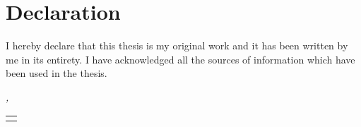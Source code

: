 \chapter*{Declaration}
\thispagestyle{empty}
I hereby declare that this thesis is my original work and it has been written
by me in its entirety. I have acknowledged all the sources of information
which have been used in the thesis.

\vspace*{1.0\baselineskip}
 
\noindent\textit{\myLocation, \myTime}

\vspace*{-1.0\baselineskip}
	
\begin{flushright}
	
	\vspace*{1.6\baselineskip}
	
	\begin{tabular}{m{5cm}}
		\\ \hline
		\centering\myName \\
	\end{tabular}
	
	\vspace*{-3.7\baselineskip}
	
	\begin{tabular}{m{5cm}}
	\end{tabular}
	
\end{flushright}

